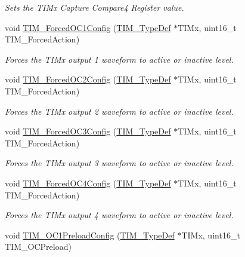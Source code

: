 \begin{DoxyCompactItemize}
\begin{DoxyCompactList}\small\item\em Sets the T\+I\+Mx Capture Compare4 Register value. \end{DoxyCompactList}\item 
void \hyperlink{group___t_i_m___group2_ga4f58c12e6493a0d8b9555c9097b831d6}{T\+I\+M\+\_\+\+Forced\+O\+C1\+Config} (\hyperlink{struct_t_i_m___type_def}{T\+I\+M\+\_\+\+Type\+Def} $\ast$T\+I\+Mx, uint16\+\_\+t T\+I\+M\+\_\+\+Forced\+Action)
\begin{DoxyCompactList}\small\item\em Forces the T\+I\+Mx output 1 waveform to active or inactive level. \end{DoxyCompactList}\item 
void \hyperlink{group___t_i_m___group2_ga3d2902b6fbab8dd55cd531055ffcc63d}{T\+I\+M\+\_\+\+Forced\+O\+C2\+Config} (\hyperlink{struct_t_i_m___type_def}{T\+I\+M\+\_\+\+Type\+Def} $\ast$T\+I\+Mx, uint16\+\_\+t T\+I\+M\+\_\+\+Forced\+Action)
\begin{DoxyCompactList}\small\item\em Forces the T\+I\+Mx output 2 waveform to active or inactive level. \end{DoxyCompactList}\item 
void \hyperlink{group___t_i_m___group2_ga920b0fb4ca44fceffd1c3e441feebd8f}{T\+I\+M\+\_\+\+Forced\+O\+C3\+Config} (\hyperlink{struct_t_i_m___type_def}{T\+I\+M\+\_\+\+Type\+Def} $\ast$T\+I\+Mx, uint16\+\_\+t T\+I\+M\+\_\+\+Forced\+Action)
\begin{DoxyCompactList}\small\item\em Forces the T\+I\+Mx output 3 waveform to active or inactive level. \end{DoxyCompactList}\item 
void \hyperlink{group___t_i_m___group2_gaf0a0bbe74251e56d4b835d20b0a3aa63}{T\+I\+M\+\_\+\+Forced\+O\+C4\+Config} (\hyperlink{struct_t_i_m___type_def}{T\+I\+M\+\_\+\+Type\+Def} $\ast$T\+I\+Mx, uint16\+\_\+t T\+I\+M\+\_\+\+Forced\+Action)
\begin{DoxyCompactList}\small\item\em Forces the T\+I\+Mx output 4 waveform to active or inactive level. \end{DoxyCompactList}\item 
void \hyperlink{group___t_i_m___group2_ga60e6c29ad8f919bef616cf8e3306dd64}{T\+I\+M\+\_\+\+O\+C1\+Preload\+Config} (\hyperlink{struct_t_i_m___type_def}{T\+I\+M\+\_\+\+Type\+Def} $\ast$T\+I\+Mx, uint16\+\_\+t T\+I\+M\+\_\+\+O\+C\+Preload)

\end{DoxyCompactItemize}
